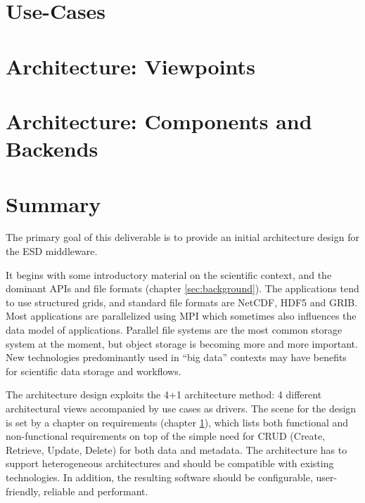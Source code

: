 \documentclass[a4paper,11pt]{esiwace-modified}
\begin{document}
\chapter{Use-Cases}
\label{chap:use cases}




\chapter{Architecture: Viewpoints}
\label{chap:viewpoints}





\chapter{Architecture: Components and Backends}
\label{chap:components and backends}





\chapter{Summary}
\label{chap:summary}

The primary goal of this deliverable is to provide an initial architecture design for the ESD middleware.

It begins with some introductory material on the scientific context, and the dominant APIs and file formats (chapter \ref{sec:background}).
The applications tend to use structured grids, and standard file formats are NetCDF, HDF5 and GRIB.
Most applications are parallelized using MPI which sometimes also influences the data model of applications.
Parallel file systems are the most common storage system at the moment, but object storage is becoming more and more important.
New technologies predominantly used in ``big data'' contexts may have benefits for scientific data storage and workflows.

The architecture design exploits the 4+1 architecture method: 4 different architectural views accompanied by use cases as drivers.
The scene for the design is set by a chapter on requirements (chapter \ref{chap:use cases}), which lists both functional and non-functional requirements on top of the simple need for CRUD (Create, Retrieve, Update, Delete) for both data and metadata.
The architecture has to support heterogeneous architectures and should be compatible with existing technologies.
In addition, the resulting software should be configurable, user-friendly, reliable and performant.
\end{document}
